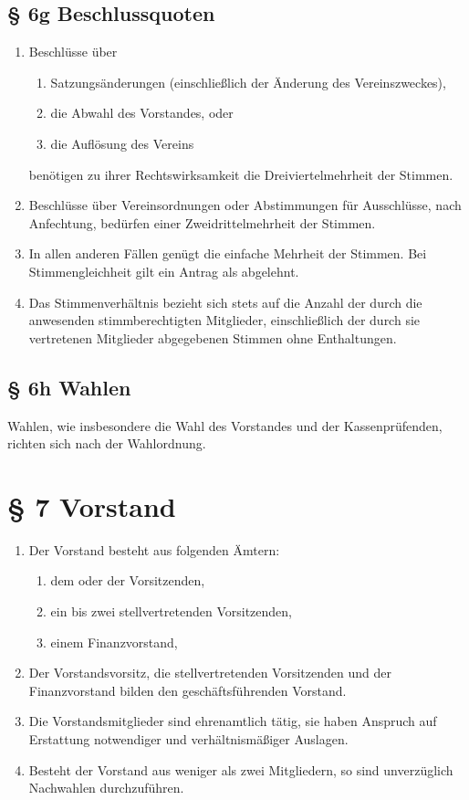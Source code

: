 \documentclass[11pt,a4paper]{scrartcl}
\begin{document}
\subsection*{§ 6g Beschlussquoten}
\begin{enumerate}[label=\arabic*.]
    \item Beschlüsse über 
    \begin{enumerate}[label=\roman*.]
        \item Satzungsänderungen (einschließlich der Änderung des Vereinszweckes),
        \item die Abwahl des Vorstandes, oder
        \item die Auflösung des Vereins
    \end{enumerate}
    benötigen zu ihrer Rechtswirksamkeit die Dreiviertelmehrheit der Stimmen.
    \item Beschlüsse über Vereinsordnungen oder Abstimmungen für Ausschlüsse, nach Anfechtung, bedürfen einer Zweidrittelmehrheit der Stimmen.
    \item In allen anderen Fällen genügt die einfache Mehrheit der Stimmen. Bei Stimmengleichheit gilt ein Antrag als abgelehnt. 
    \item Das Stimmenverhältnis bezieht sich stets auf die Anzahl der durch die anwesenden stimmberechtigten Mitglieder, einschließlich der durch sie vertretenen Mitglieder abgegebenen Stimmen ohne Enthaltungen.
\end{enumerate}

\subsection*{§ 6h Wahlen}
Wahlen, wie insbesondere die Wahl des Vorstandes und der Kassenprüfenden, richten sich nach der Wahlordnung.

\section*{§ 7 Vorstand}
\begin{enumerate}[label=\arabic*.]
    \item Der Vorstand besteht aus folgenden Ämtern: 
    \begin{enumerate}[label=\roman*.]
        \item dem oder der Vorsitzenden,
        \item ein bis zwei stellvertretenden Vorsitzenden,
        \item einem Finanzvorstand,
    \end{enumerate}
    \item Der Vorstandsvorsitz, die stellvertretenden Vorsitzenden und der Finanzvorstand bilden den geschäftsführenden Vorstand.
    \item Die Vorstandsmitglieder sind ehrenamtlich tätig, sie haben Anspruch auf Erstattung notwendiger und verhältnismäßiger Auslagen.
    \item Besteht der Vorstand aus weniger als zwei Mitgliedern, so sind unverzüglich Nachwahlen durchzuführen.
\end{enumerate}
\end{document}
